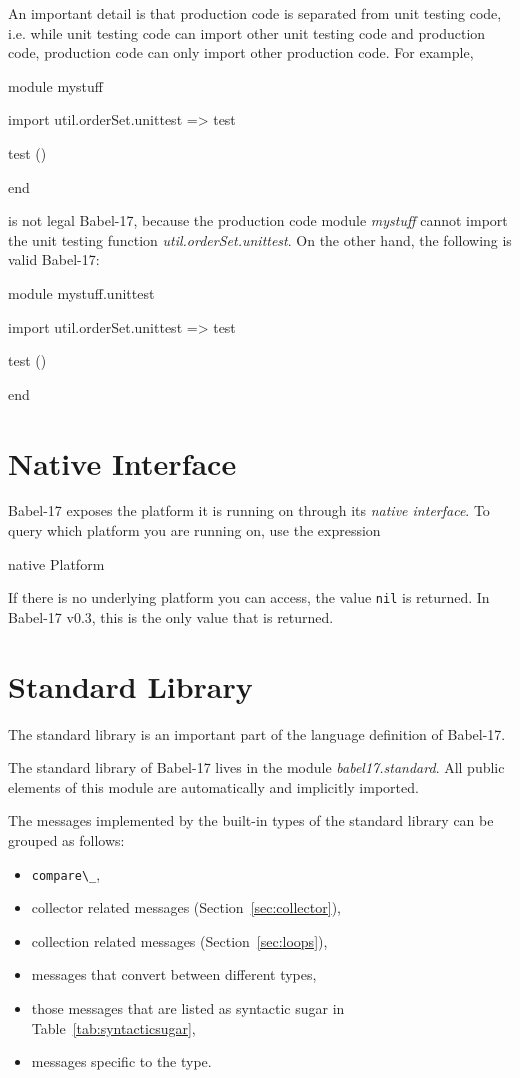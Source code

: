 \documentclass[11pt]{amsart}
\newcommand{\babelsrc}[1] {\lstinline!#1!}
\begin{document}
An important detail is that production code is separated from unit testing code, i.e. while unit testing code can import other unit testing code and production code, production code can only import other production code. For example,
\begin{babellisting}
module mystuff

import util.orderSet.unittest => test

test ()

end
\end{babellisting}
is not legal Babel-17, because the production code module \emph{mystuff} cannot import the unit testing function \emph{util.orderSet.unittest}. On the other hand, the following is valid Babel-17:
\begin{babellisting}
module mystuff.unittest

import util.orderSet.unittest => test

test ()

end
\end{babellisting}

\section{Native Interface}
Babel-17 exposes the platform it is running on through its \emph{native interface}. To query which platform you are running on, use the expression
\begin{babellisting}
	native Platform
\end{babellisting}
If there is no underlying platform you can access, the value \babelsrc{nil} is returned. In Babel-17 v0.3, this is the only value that is returned.

\section{Standard Library}
The standard library is an important part of the language definition of Babel-17.

The standard library of Babel-17 lives in the module \emph{babel17.standard}. All public elements of this module are automatically and implicitly imported.

The messages implemented by the built-in types of the standard library can be grouped as follows:
\begin{itemize}
\item \babelsrc{compare\_},
\item collector related messages (Section~\ref{sec:collector}),
\item collection related messages (Section~\ref{sec:loops}),
\item messages that convert between different types,
\item those messages that are listed as syntactic sugar in Table~\ref{tab:syntacticsugar},
\item messages specific to the type. 
\end{itemize}
\end{document}

